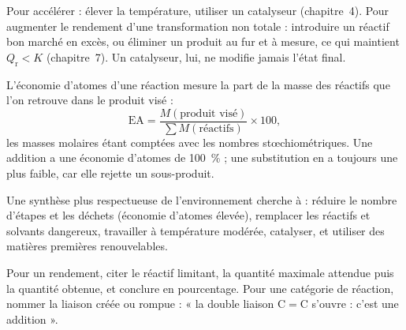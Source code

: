 \begin{propriete}
Pour accélérer : élever la température, utiliser un catalyseur (chapitre~4). Pour augmenter le rendement d'une
transformation non totale : introduire un réactif bon marché en excès, ou éliminer un produit au fur et à mesure, ce
qui maintient $Q_\mathrm{r}<K$ (chapitre~7). Un catalyseur, lui, ne modifie jamais l'état final.
\end{propriete}
\begin{definition}
L'économie d'atomes d'une réaction mesure la part de la masse des réactifs que l'on retrouve dans le produit visé :
\[\mathrm{EA}=\frac{M(\text{produit visé})}{\sum M(\text{réactifs})}\times100,\]
les masses molaires étant comptées avec les nombres stœchiométriques. Une addition a une économie d'atomes de
100~\% ; une substitution en a toujours une plus faible, car elle rejette un sous-produit.
\end{definition}
\begin{propriete}
Une synthèse plus respectueuse de l'environnement cherche à : réduire le nombre d'étapes et les déchets (économie
d'atomes élevée), remplacer les réactifs et solvants dangereux, travailler à température modérée, catalyser, et
utiliser des matières premières renouvelables.
\end{propriete}
\begin{rediger}
Pour un rendement, citer le réactif limitant, la quantité maximale attendue puis la quantité obtenue, et conclure en
pourcentage. Pour une catégorie de réaction, nommer la liaison créée ou rompue : « la double liaison C$=$C s'ouvre :
c'est une addition ».
\end{rediger}
\exercices

